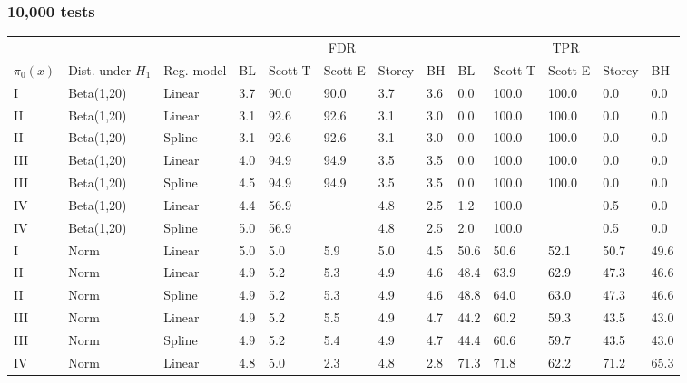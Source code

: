 \documentclass{article}\usepackage[]{graphicx}\usepackage[]{color}
\begin{document}
\clearpage

\subsubsection*{10,000 tests}





\begin{table}[ht]
\centering
\begin{tabular}{lll|lllll|lllll}
  \hline
  &&& \multicolumn{5}{c}{FDR} & \multicolumn{5}{c}{TPR}\\
 $\pi_0(x)$ &  Dist. under $H_1$ & Reg. model & BL & Scott T & Scott E & Storey & BH & BL & Scott T & Scott E & Storey & BH    \\
 \hline
I & Beta(1,20) & Linear & 3.7 & 90.0 & 90.0 & 3.7 & 3.6 & 0.0 & 100.0 & 100.0 & 0.0 & 0.0 \\ 
  II & Beta(1,20) & Linear & 3.1 & 92.6 & 92.6 & 3.1 & 3.0 & 0.0 & 100.0 & 100.0 & 0.0 & 0.0 \\ 
  II & Beta(1,20) & Spline & 3.1 & 92.6 & 92.6 & 3.1 & 3.0 & 0.0 & 100.0 & 100.0 & 0.0 & 0.0 \\ 
  III & Beta(1,20) & Linear & 4.0 & 94.9 & 94.9 & 3.5 & 3.5 & 0.0 & 100.0 & 100.0 & 0.0 & 0.0 \\ 
  III & Beta(1,20) & Spline & 4.5 & 94.9 & 94.9 & 3.5 & 3.5 & 0.0 & 100.0 & 100.0 & 0.0 & 0.0 \\ 
  IV & Beta(1,20) & Linear & 4.4 & 56.9 &  & 4.8 & 2.5 & 1.2 & 100.0 &  & 0.5 & 0.0 \\ 
  IV & Beta(1,20) & Spline & 5.0 & 56.9 &  & 4.8 & 2.5 & 2.0 & 100.0 &  & 0.5 & 0.0 \\ 
   \hline
I & Norm & Linear & 5.0 & 5.0 & 5.9 & 5.0 & 4.5 & 50.6 & 50.6 & 52.1 & 50.7 & 49.6 \\ 
  II & Norm & Linear & 4.9 & 5.2 & 5.3 & 4.9 & 4.6 & 48.4 & 63.9 & 62.9 & 47.3 & 46.6 \\ 
  II & Norm & Spline & 4.9 & 5.2 & 5.3 & 4.9 & 4.6 & 48.8 & 64.0 & 63.0 & 47.3 & 46.6 \\ 
  III & Norm & Linear & 4.9 & 5.2 & 5.5 & 4.9 & 4.7 & 44.2 & 60.2 & 59.3 & 43.5 & 43.0 \\ 
  III & Norm & Spline & 4.9 & 5.2 & 5.4 & 4.9 & 4.7 & 44.4 & 60.6 & 59.7 & 43.5 & 43.0 \\ 
  IV & Norm & Linear & 4.8 & 5.0 & 2.3 & 4.8 & 2.8 & 71.3 & 71.8 & 62.2 & 71.2 & 65.3 \\ 

\end{tabular}
\end{table}
\end{document}
